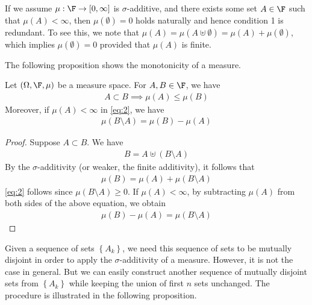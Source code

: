 \documentclass[thmcnt=section, 12pt]{elegantbook}
\begin{document}
\begin{remark}
    If we assume $\mu: \F \to [0, \infty]$ is $\sigma$-additive, and there exists some set $A \in \F$ such that $\mu(A) < \infty$, then $\mu(\emptyset) = 0$ holds naturally and hence condition 1 is redundant. To see this, we note that $\mu(A) = \mu(A \uplus \emptyset) = \mu(A) + \mu(\emptyset)$, which implies $\mu(\emptyset) = 0$ provided that $\mu(A)$ is finite.
\end{remark}


\par The following proposition shows the monotonicity of a measure.

\begin{proposition} \label{pro:2}
    Let $(\Omega, \F, \mu)$ be a measure space. For $A, B \in \F$, we have
    \begin{align}
        A \subset B \implies \mu(A) \leq \mu(B)
        \label{eq:2}
    \end{align}
    Moreover, if $\mu(A) < \infty$ in \eqref{eq:2}, we have 
    \begin{align*}
        \mu(B \setminus A) = \mu(B) - \mu(A)
    \end{align*}
\end{proposition}

\begin{proof}
    Suppose $A \subset B$. We have 
    \begin{align*}
        B = A \uplus (B \setminus A)
    \end{align*}
    By the $\sigma$-additivity (or weaker, the finite additivity), it follows that 
    \begin{align*}
        \mu(B) = \mu(A) + \mu(B \setminus A)
    \end{align*}
    \eqref{eq:2} follows since $\mu(B \setminus A) \geq 0$. If $\mu(A) < \infty$, by subtracting $\mu(A)$ from both sides of the above equation, we obtain
    \begin{align*}
        \mu(B) - \mu(A) = \mu(B \setminus A)
    \end{align*}
\end{proof}


\par Given a sequence of sets $\left\{A_k\right\}$, we need this sequence of sets to be mutually disjoint in order to apply the $\sigma$-additivity of a measure. However, it is not the case in general. But we can easily construct another sequence of mutually disjoint sets from $\left\{A_k\right\}$ while keeping the union of first $n$ sets unchanged. The procedure is illustrated in the following proposition.
\end{document}
